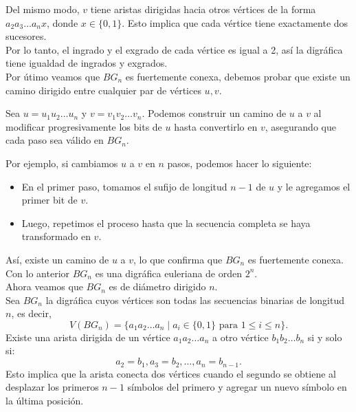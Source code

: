\documentclass[12pt]{article}
\begin{document}
Del mismo modo, $ v $ tiene aristas dirigidas hacia otros vértices de la forma
 $ a_2a_3 \dots a_n x $, donde $ x \in \{0,1\} $. Esto implica que cada vértice tiene exactamente
  dos sucesores.\\

Por lo tanto, el ingrado y el exgrado de cada vértice es igual a 2, así la digráfica tiene 
igualdad de ingrados y exgrados.\\

Por útimo veamos que $BG_n$ es fuertemente conexa, debemos probar que existe un camino dirigido 
entre cualquier par de vértices $ u, v $.

Sea $ u = u_1u_2 \dots u_n $ y $ v = v_1v_2 \dots v_n $. Podemos construir un camino 
de $ u $ a $ v $ al modificar progresivamente los bits de $ u $ hasta convertirlo en $ v $, 
asegurando que cada paso sea válido en $ BG_n $.

Por ejemplo, si cambiamos $ u $ a $ v $ en $ n $ pasos, podemos hacer lo siguiente:
\begin{itemize}
    \item En el primer paso, tomamos el sufijo de longitud $ n-1 $ de $ u $ y le agregamos el
     primer bit de $ v $.
    \item Luego, repetimos el proceso hasta que la secuencia completa se haya transformado 
    en $ v $.
\end{itemize}

Así, existe un camino de $ u $ a $ v $, lo que confirma que $ BG_n $ es fuertemente conexa.\\

Con lo anterior $BG_n$ es una digráfica euleriana de orden $2^n$.\\

Ahora veamos que $BG_n$ es de diámetro dirigido $n$.\\

Sea \( BG_n \) la digráfica cuyos vértices son todas las secuencias binarias de longitud \( n \), es decir,
\[
V(BG_n) = \{ a_1a_2 \dots a_n \mid a_i \in \{0,1\} \text{ para } 1 \leq i \leq n \}.
\]
Existe una arista dirigida de un vértice \( a_1a_2 \dots a_n \) a otro vértice \( b_1b_2 \dots b_n \) si y solo si:
\[
a_2 = b_1, a_3 = b_2, \dots, a_n = b_{n-1}.
\]
Esto implica que la arista conecta dos vértices cuando el segundo se obtiene al desplazar los primeros \( n-1 \) símbolos del primero y agregar un nuevo símbolo en la última posición.
\end{document}
